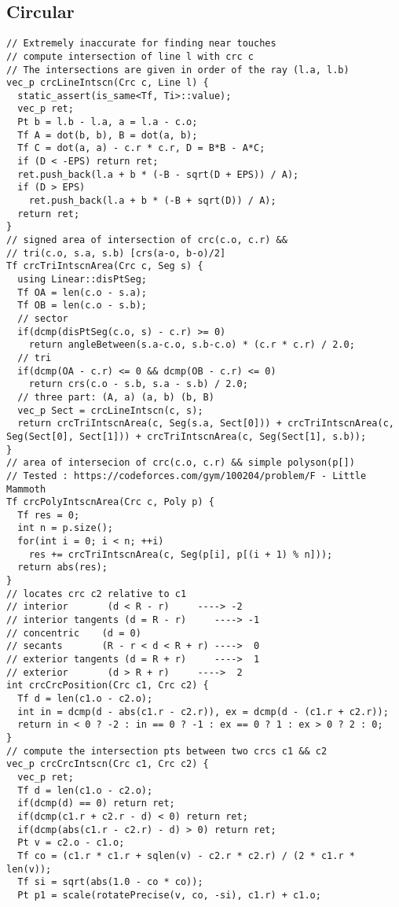 \documentclass[FSZ,a4paper,onesided]{article}
\begin{document}
\begin{multicols*}{\COLS}
\subsection{Circular}
\begin{lstlisting}
// Extremely inaccurate for finding near touches
// compute intersection of line l with crc c
// The intersections are given in order of the ray (l.a, l.b)
vec_p crcLineIntscn(Crc c, Line l) {
  static_assert(is_same<Tf, Ti>::value);
  vec_p ret;
  Pt b = l.b - l.a, a = l.a - c.o;
  Tf A = dot(b, b), B = dot(a, b);
  Tf C = dot(a, a) - c.r * c.r, D = B*B - A*C;
  if (D < -EPS) return ret;
  ret.push_back(l.a + b * (-B - sqrt(D + EPS)) / A);
  if (D > EPS)
    ret.push_back(l.a + b * (-B + sqrt(D)) / A);
  return ret;
}
// signed area of intersection of crc(c.o, c.r) &&
// tri(c.o, s.a, s.b) [crs(a-o, b-o)/2]
Tf crcTriIntscnArea(Crc c, Seg s) {
  using Linear::disPtSeg;
  Tf OA = len(c.o - s.a);
  Tf OB = len(c.o - s.b);
  // sector
  if(dcmp(disPtSeg(c.o, s) - c.r) >= 0)
    return angleBetween(s.a-c.o, s.b-c.o) * (c.r * c.r) / 2.0;
  // tri
  if(dcmp(OA - c.r) <= 0 && dcmp(OB - c.r) <= 0)
    return crs(c.o - s.b, s.a - s.b) / 2.0;
  // three part: (A, a) (a, b) (b, B)
  vec_p Sect = crcLineIntscn(c, s);
  return crcTriIntscnArea(c, Seg(s.a, Sect[0])) + crcTriIntscnArea(c, Seg(Sect[0], Sect[1])) + crcTriIntscnArea(c, Seg(Sect[1], s.b));
}
// area of intersecion of crc(c.o, c.r) && simple polyson(p[])
// Tested : https://codeforces.com/gym/100204/problem/F - Little Mammoth
Tf crcPolyIntscnArea(Crc c, Poly p) {
  Tf res = 0;
  int n = p.size();
  for(int i = 0; i < n; ++i)
    res += crcTriIntscnArea(c, Seg(p[i], p[(i + 1) % n]));
  return abs(res);
}
// locates crc c2 relative to c1
// interior       (d < R - r)     ----> -2
// interior tangents (d = R - r)     ----> -1
// concentric    (d = 0)
// secants       (R - r < d < R + r) ---->  0
// exterior tangents (d = R + r)     ---->  1
// exterior       (d > R + r)     ---->  2
int crcCrcPosition(Crc c1, Crc c2) {
  Tf d = len(c1.o - c2.o);
  int in = dcmp(d - abs(c1.r - c2.r)), ex = dcmp(d - (c1.r + c2.r));
  return in < 0 ? -2 : in == 0 ? -1 : ex == 0 ? 1 : ex > 0 ? 2 : 0;
}
// compute the intersection pts between two crcs c1 && c2
vec_p crcCrcIntscn(Crc c1, Crc c2) {
  vec_p ret;
  Tf d = len(c1.o - c2.o);
  if(dcmp(d) == 0) return ret;
  if(dcmp(c1.r + c2.r - d) < 0) return ret;
  if(dcmp(abs(c1.r - c2.r) - d) > 0) return ret;
  Pt v = c2.o - c1.o;
  Tf co = (c1.r * c1.r + sqlen(v) - c2.r * c2.r) / (2 * c1.r * len(v));
  Tf si = sqrt(abs(1.0 - co * co));
  Pt p1 = scale(rotatePrecise(v, co, -si), c1.r) + c1.o;

\end{lstlisting}
\end{multicols*}
\end{document}
